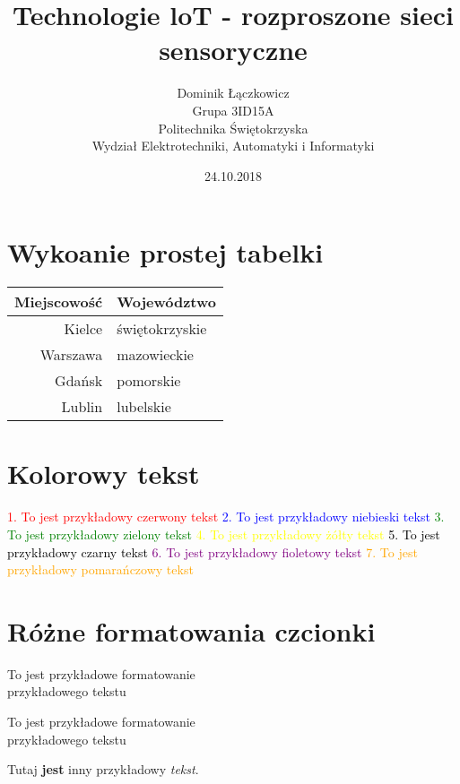 \documentclass[a4paper]{article}
\title{Technologie loT - rozproszone sieci sensoryczne}
\author{
        Dominik Łączkowicz \\
                Grupa 3ID15A\\
        Politechnika Świętokrzyska\\
        Wydział Elektrotechniki, Automatyki i Informatyki\\
        }
\date{24.10.2018}
\begin{document}
\maketitle
\tableofcontents
\section{Wykoanie prostej tabelki}

\begin{tabular}{|r|l|}
  \hline 
  Miejscowość & Województwo\\
  \hline
  Kielce & świętokrzyskie \\
  \hline
  Warszawa & mazowieckie \\
  \hline
  Gdańsk & pomorskie \\
  \hline
  Lublin & lubelskie \\
  \hline
\end{tabular} 



\section{Kolorowy tekst}

\textcolor{red}{1. To jest przykładowy czerwony tekst}
\newline
\textcolor{blue}{2. To jest przykładowy niebieski tekst}
\newline
\textcolor{green}{3. To jest przykładowy zielony tekst}
\newline
\textcolor{yellow}{4. To jest przykładowy żółty tekst}
\newline
\textcolor{black}{5. To jest przykładowy czarny tekst}
\newline
\textcolor{purple}{6. To jest przykładowy fioletowy tekst}
\newline
\textcolor{orange}{7. To jest przykładowy pomarańczowy tekst}

\section{Różne formatowania czcionki}


{\Large To jest przykładowe formatowanie\\
przykładowego tekstu\par}
{\Large To jest przykładowe formatowanie\\
przykładowego tekstu}\par

{\small Tutaj
\textbf{jest} inny }
{\Large przykładowy \textit{tekst}.}
\newline
\end{document}
